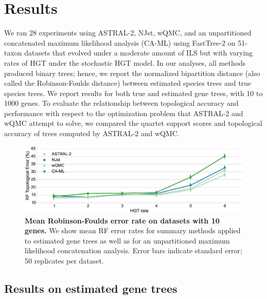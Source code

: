 \section{Results}

We ran 28 experiments using ASTRAL-2, NJst, wQMC, and an
unpartitioned concatenated
maximum likelihood analysis (CA-ML) using FastTree-2 
 on 51-taxon datasets that  evolved under a moderate amount of ILS but with varying rates of HGT   under the stochastic HGT model. 
In our analyses, all methods produced binary trees; hence,
we report the normalized bipartition distance (also called
the Robinson-Foulds \cite{RF} distance) between estimated
species trees and true species trees. 
We report results for both true and estimated gene trees, with  10 to 1000 genes.  
To evaluate the relationship between topological accuracy 
and performance with respect to the optimization problem that ASTRAL-2 and
wQMC attempt to solve, 
we compared the quartet support scores and topological accuracy of trees
computed by ASTRAL-2 and wQMC.

  \begin{figure}[h!]
\centering
\includegraphics[width=\textwidth]{hgt-figs/10-est.eps}
 \caption[Mean Robinson-Foulds error rate on 
datasets with 10 genes]{{\bf Mean Robinson-Foulds error rate on 
datasets with 10 genes. } We
show mean RF error rates for summary methods applied to
estimated gene trees as well as for an unpartitioned
maximum likelihood 
concatenation analysis. Error bars indicate standard error; 
50 replicates per dataset. 
}
\label{hgt::fig1}
      \end{figure}

\subsection{Results on estimated gene trees}

